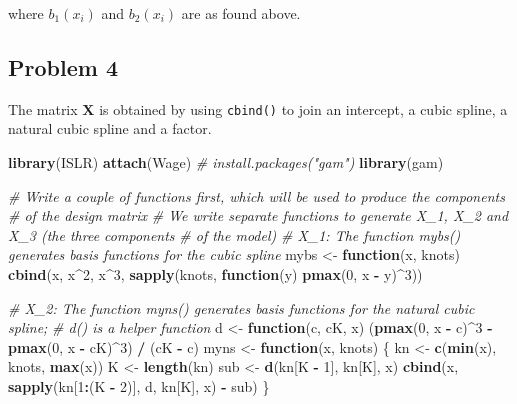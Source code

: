 \documentclass[
]{article}
\newenvironment{Shaded}{\begin{snugshade}}{\end{snugshade}}
\newcommand{\CommentTok}[1]{\textcolor[rgb]{0.56,0.35,0.01}{\textit{#1}}}
\newcommand{\ControlFlowTok}[1]{\textcolor[rgb]{0.13,0.29,0.53}{\textbf{#1}}}
\newcommand{\DecValTok}[1]{\textcolor[rgb]{0.00,0.00,0.81}{#1}}
\newcommand{\FunctionTok}[1]{\textcolor[rgb]{0.13,0.29,0.53}{\textbf{#1}}}
\newcommand{\NormalTok}[1]{#1}
\newcommand{\OtherTok}[1]{\textcolor[rgb]{0.56,0.35,0.01}{#1}}
\newcommand{\SpecialCharTok}[1]{\textcolor[rgb]{0.81,0.36,0.00}{\textbf{#1}}}
\begin{document}
where \(b_1(x_i)\) and \(b_2(x_i)\) are as found above.

\hypertarget{problem-4}{%
\subsection{Problem 4}\label{problem-4}}

The matrix \(\mathbf X\) is obtained by using \texttt{cbind()} to join
an intercept, a cubic spline, a natural cubic spline and a factor.

\begin{Shaded}
\begin{Highlighting}[]
\FunctionTok{library}\NormalTok{(ISLR)}
\FunctionTok{attach}\NormalTok{(Wage)}
\CommentTok{\# install.packages("gam")}
\FunctionTok{library}\NormalTok{(gam)}

\CommentTok{\# Write a couple of functions first, which will be used to produce the components}
\CommentTok{\# of the design matrix}
\CommentTok{\# We write separate functions to generate X\_1, X\_2 and X\_3 (the three components}
\CommentTok{\# of the model)}
\CommentTok{\# X\_1: The function mybs() generates basis functions for the cubic spline}
\NormalTok{mybs }\OtherTok{\textless{}{-}} \ControlFlowTok{function}\NormalTok{(x, knots) }\FunctionTok{cbind}\NormalTok{(x, x}\SpecialCharTok{\^{}}\DecValTok{2}\NormalTok{, x}\SpecialCharTok{\^{}}\DecValTok{3}\NormalTok{, }\FunctionTok{sapply}\NormalTok{(knots, }\ControlFlowTok{function}\NormalTok{(y) }\FunctionTok{pmax}\NormalTok{(}\DecValTok{0}\NormalTok{, x }\SpecialCharTok{{-}}\NormalTok{ y)}\SpecialCharTok{\^{}}\DecValTok{3}\NormalTok{))}

\CommentTok{\# X\_2: The function myns() generates basis functions for the natural cubic spline;}
\CommentTok{\# d() is a helper function}
\NormalTok{d }\OtherTok{\textless{}{-}} \ControlFlowTok{function}\NormalTok{(c, cK, x) (}\FunctionTok{pmax}\NormalTok{(}\DecValTok{0}\NormalTok{, x }\SpecialCharTok{{-}}\NormalTok{ c)}\SpecialCharTok{\^{}}\DecValTok{3} \SpecialCharTok{{-}} \FunctionTok{pmax}\NormalTok{(}\DecValTok{0}\NormalTok{, x }\SpecialCharTok{{-}}\NormalTok{ cK)}\SpecialCharTok{\^{}}\DecValTok{3}\NormalTok{) }\SpecialCharTok{/}\NormalTok{ (cK }\SpecialCharTok{{-}}\NormalTok{ c)}
\NormalTok{myns }\OtherTok{\textless{}{-}} \ControlFlowTok{function}\NormalTok{(x, knots) \{}
\NormalTok{  kn }\OtherTok{\textless{}{-}} \FunctionTok{c}\NormalTok{(}\FunctionTok{min}\NormalTok{(x), knots, }\FunctionTok{max}\NormalTok{(x))}
\NormalTok{  K }\OtherTok{\textless{}{-}} \FunctionTok{length}\NormalTok{(kn)}
\NormalTok{  sub }\OtherTok{\textless{}{-}} \FunctionTok{d}\NormalTok{(kn[K }\SpecialCharTok{{-}} \DecValTok{1}\NormalTok{], kn[K], x)}
  \FunctionTok{cbind}\NormalTok{(x, }\FunctionTok{sapply}\NormalTok{(kn[}\DecValTok{1}\SpecialCharTok{:}\NormalTok{(K }\SpecialCharTok{{-}} \DecValTok{2}\NormalTok{)], d, kn[K], x) }\SpecialCharTok{{-}}\NormalTok{ sub)}
\NormalTok{\}}


\end{Highlighting}
\end{Shaded}
\end{document}
